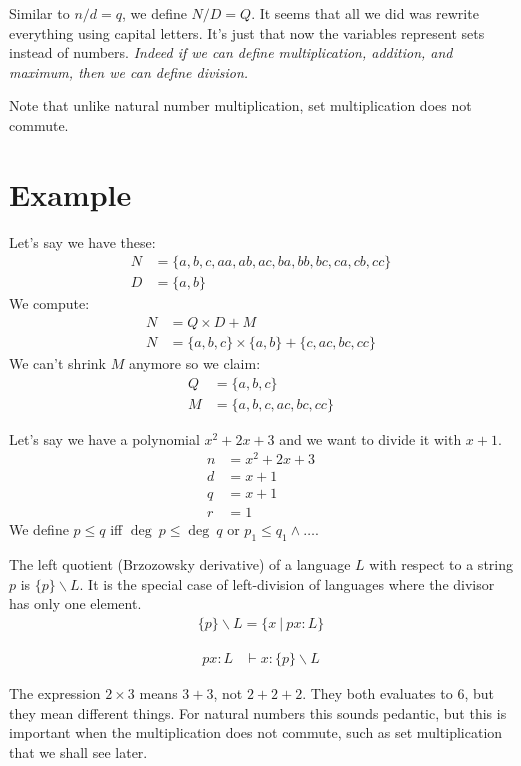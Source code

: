 Similar to \(n/d = q\), we define \( N / D = Q \).
It seems that all we did was rewrite everything using capital letters.
It's just that now the variables represent sets instead of numbers.
\emph{Indeed if we can define multiplication, addition, and maximum,
then we can define division.}

Note that unlike natural number multiplication,
set multiplication does not commute.

\section{Example}

Let's say we have these:
\begin{align*}
    N &= \{ a, b, c, aa, ab, ac, ba, bb, bc, ca, cb, cc \}
    \\
    D &= \{ a, b \}
\end{align*}
We compute:
\begin{align*}
    N &= Q \times D + M
    \\
    N &= \{ a, b, c \} \times \{ a, b \} + \{ c, ac, bc, cc \}
\end{align*}
We can't shrink \(M\) anymore
so we claim:
\begin{align*}
    Q &= \{ a, b, c \}
    \\
    M &= \{ a, b, c, ac, bc, cc \}
\end{align*}

Let's say we have a polynomial \(x^2 + 2x + 3\) and we want to divide it with \(x + 1\).
\begin{align*}
    n &= x^2 + 2x + 3
    \\
    d &= x + 1
    \\
    q &= x + 1
    \\
    r &= 1
\end{align*}
We define \(p \le q\) iff \(\deg~p \le \deg~q\) or \(p_1 \le q_1 \wedge \ldots\).

The left quotient (Brzozowsky derivative)
of a language \(L\) with respect to a string \(p\) is \(\{p\} \backslash L\).
It is the special case of left-division of languages
where the divisor has only one element.
\begin{align}
    \{p\} \backslash L = \{ x ~|~ px : L \}
\end{align}

\begin{align}
    px : L &\vdash x : \{p\} \backslash L
\end{align}

The expression \(2 \times 3\) means \(3+3\), not \(2+2+2\).
They both evaluates to \(6\), but they mean different things.
For natural numbers this sounds pedantic,
but this is important when the multiplication does not commute,
such as set multiplication that we shall see later.
